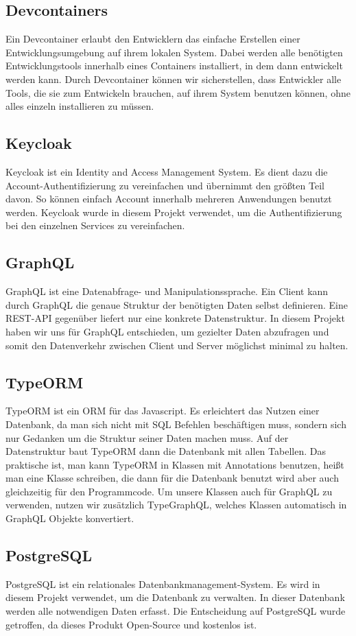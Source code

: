 \subsection{Devcontainers}
    Ein Devcontainer erlaubt den Entwicklern das einfache Erstellen einer Entwicklungsumgebung auf ihrem lokalen System.
    Dabei werden alle benötigten Entwicklungstools innerhalb eines Containers installiert, in dem dann entwickelt werden kann.
    Durch Devcontainer können wir sicherstellen, dass Entwickler alle Tools, die sie zum Entwickeln brauchen, auf ihrem System benutzen können, ohne alles einzeln installieren zu müssen.
\subsection{Keycloak}
    Keycloak ist ein Identity and Access Management System. Es dient dazu die Account-Authentifizierung zu vereinfachen und übernimmt den größten Teil davon.
    So können einfach Account innerhalb mehreren Anwendungen benutzt werden. Keycloak wurde in diesem Projekt verwendet, um die Authentifizierung bei den einzelnen Services zu vereinfachen.
\subsection{GraphQL}
    GraphQL ist eine Datenabfrage- und Manipulationssprache. Ein Client kann durch GraphQL die genaue Struktur der benötigten Daten selbst definieren.
    Eine REST-API gegenüber liefert nur eine konkrete Datenstruktur.
    In diesem Projekt haben wir uns für GraphQL entschieden, um gezielter Daten abzufragen und somit den Datenverkehr zwischen Client und Server möglichst minimal zu halten.
\subsection{TypeORM}
    TypeORM ist ein \ac{ORM} für das Javascript. Es erleichtert das Nutzen einer Datenbank, da man sich nicht mit \ac{SQL} Befehlen beschäftigen muss, sondern sich nur Gedanken um die Struktur seiner Daten machen muss.
    Auf der Datenstruktur baut TypeORM dann die Datenbank mit allen Tabellen. Das praktische ist, man kann TypeORM in Klassen mit Annotations benutzen, heißt man eine Klasse schreiben, die dann für die Datenbank benutzt wird
    aber auch gleichzeitig für den Programmcode. Um unsere Klassen auch für GraphQL zu verwenden, nutzen wir zusätzlich TypeGraphQL, welches Klassen automatisch in GraphQL Objekte konvertiert.
\subsection{PostgreSQL}
    PostgreSQL ist ein relationales Datenbankmanagement-System. Es wird in diesem Projekt verwendet, um die Datenbank zu verwalten. In dieser Datenbank werden alle notwendigen Daten erfasst.
    Die Entscheidung auf PostgreSQL wurde getroffen, da dieses Produkt Open-Source und kostenlos ist.    
